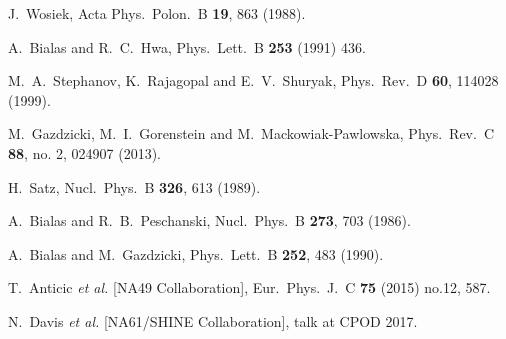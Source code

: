 \documentclass{PoS}
\begin{document}
\begin{thebibliography}{99}
J.~Wosiek, Acta Phys.\ Polon.\ B {\bf 19}, 863 (1988).

A.~Bialas and R.~C.~Hwa,
Phys.\ Lett.\ B {\bf 253} (1991) 436.

M.~A.~Stephanov, K.~Rajagopal and E.~V.~Shuryak,
Phys.\ Rev.\ D {\bf 60}, 114028 (1999).


M.~Gazdzicki, M.~I.~Gorenstein and M.~Mackowiak-Pawlowska,
Phys.\ Rev.\ C {\bf 88}, no. 2, 024907 (2013).


H.~Satz,
Nucl.\ Phys.\ B {\bf 326}, 613 (1989).

A.~Bialas and R.~B.~Peschanski,
Nucl.\ Phys.\ B {\bf 273}, 703 (1986).



A.~Bialas and M.~Gazdzicki,
Phys.\ Lett.\ B {\bf 252}, 483 (1990).

T.~Anticic {\it et al.} [NA49 Collaboration],
Eur.\ Phys.\ J.\ C {\bf 75} (2015) no.12,  587.

N.~Davis \textit{et al.} [NA61/SHINE Collaboration],
talk at CPOD 2017.


\end{thebibliography}
\end{document}
